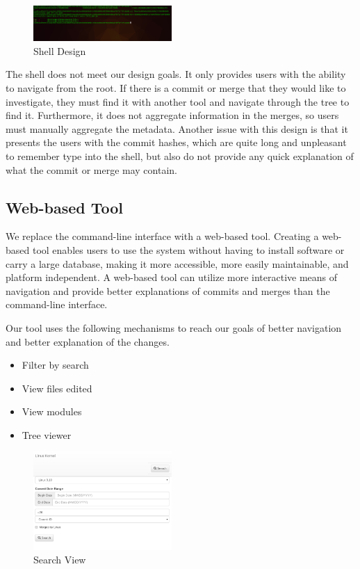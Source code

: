 \documentclass[conference, draftclsnofoot]{IEEEtran}
\begin{document}
\begin{figure}
        \centering
        \includegraphics[width=0.47\textwidth]{figures/shell.png}
        \caption{Shell Design}
        \label{fig:shell}
\end{figure}

The shell does not meet our design goals. It only provides users with the ability to
navigate from the root. If there is a commit or merge that they would like to
investigate, they must find it with another tool and navigate through the tree to
find it. Furthermore, it does not aggregate information in the merges, so users must
manually aggregate the metadata. Another issue with this design is that it presents
the users with the commit hashes, which are quite long and unpleasant to remember
type into the shell, but also do not provide any quick explanation of what the
commit or merge may contain.

\subsection{Web-based Tool}

We replace the command-line interface with a web-based tool. Creating a web-based
tool enables users to use the system without having to install software or carry a
large database, making it more accessible, more easily maintainable, and platform
independent. A web-based tool can utilize more interactive means of navigation and
provide better explanations of commits and merges than the command-line interface.

Our tool uses the following mechanisms to reach our goals of better navigation and
better explanation of the changes.

\begin{itemize}
        \item Filter by search
        \item View files edited
        \item View modules
        \item Tree viewer
\end{itemize}


\begin{figure}
        \centering
        \includegraphics[width=0.47\textwidth]{figures/search.png}
        \caption{Search View}
        \label{fig:search}
\end{figure}
\end{document}
